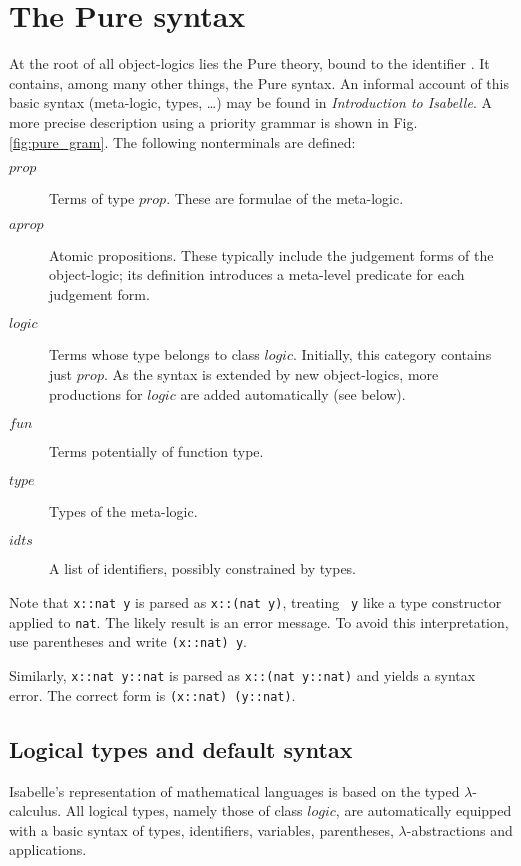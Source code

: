 \section{The Pure syntax} \label{sec:basic_syntax}

At the root of all object-logics lies the Pure theory,
bound to the \ML{} identifier .  It contains, among many
other things, the Pure syntax. An informal account of this basic syntax
(meta-logic, types, \ldots) may be found in {\em Introduction to Isabelle}.
A more precise description using a priority grammar is shown in
Fig.\ts\ref{fig:pure_gram}.  The following nonterminals are defined:
\begin{description}
  \item[$prop$] Terms of type $prop$.  These are formulae of the meta-logic.

  \item[$aprop$] Atomic propositions.  These typically include the
    judgement forms of the object-logic; its definition introduces a
    meta-level predicate for each judgement form.

  \item[$logic$] Terms whose type belongs to class $logic$.  Initially,
    this category contains just $prop$.  As the syntax is extended by new
    object-logics, more productions for $logic$ are added automatically
    (see below).

  \item[$fun$] Terms potentially of function type.

  \item[$type$] Types of the meta-logic.

  \item[$idts$] A list of identifiers, possibly constrained by types.  
\end{description}

\begin{warn}
  Note that \verb|x::nat y| is parsed as \verb|x::(nat y)|, treating {\tt
    y} like a type constructor applied to {\tt nat}.  The likely result is
  an error message.  To avoid this interpretation, use parentheses and
  write \verb|(x::nat) y|.

  Similarly, \verb|x::nat y::nat| is parsed as \verb|x::(nat y::nat)| and
  yields a syntax error.  The correct form is \verb|(x::nat) (y::nat)|.
\end{warn}

\subsection{Logical types and default syntax}\label{logical-types}
Isabelle's representation of mathematical languages is based on the typed
$\lambda$-calculus.  All logical types, namely those of class $logic$, are
automatically equipped with a basic syntax of types, identifiers,
variables, parentheses, $\lambda$-abstractions and applications.  

